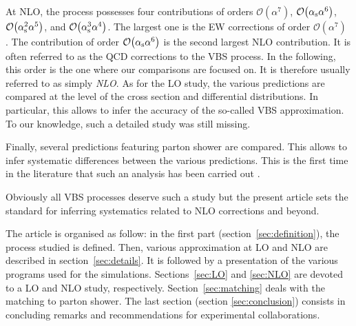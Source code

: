 At NLO, the process possesses four contributions of orders 
$\mathcal{O}{\left(\alpha^{7}\right)}$,
$\mathcal{O}{\left(\alpha_\text{s}\alpha^{6}\right)}$,
$\mathcal{O}{\left(\alpha_\text{s}^{2}\alpha^{5}\right)}$, and
$\mathcal{O}{\left(\alpha_\text{s}^{3}\alpha^{4}\right)}$.
The largest one is the EW corrections of order $\mathcal{O}{\left(\alpha^{7}\right)}$ \cite{Biedermann:2016yds,Biedermann:2017bss}.
The contribution of order $\mathcal{O}{\left(\alpha_\text{s}\alpha^{6}\right)}$ is the second largest NLO contribution.
It is often referred to as the QCD corrections to the VBS process.
In the following, this order is the one where our comparisons are focused on.
It is therefore usually referred to as simply \emph{NLO}.
As for the LO study, the various predictions are compared at the level of the cross section and differential distributions.
In particular, this allows to infer the accuracy of the so-called VBS approximation.
To our knowledge, such a detailed study was still missing.

Finally, several predictions featuring parton shower are compared.
This allows to infer systematic differences between the various predictions.
This is the first time in the literature that such an analysis has been carried out .

Obviously all VBS processes deserve such a study but the present article sets the standard for inferring systematics related to NLO corrections and beyond.


The article is organised as follow:
in the first part (section~\ref{sec:definition}), the process studied is defined.
Then, various approximation at LO and NLO are described in section~\ref{sec:details}.
It is followed by a presentation of the various programs used for the simulations.
Sections~\ref{sec:LO} and \ref{sec:NLO} are devoted to a LO and NLO study, respectively.
Section~\ref{sec:matching} deals with the matching to parton shower.
The last section (section \ref{sec:conclusion}) consists in concluding remarks and recommendations for experimental collaborations.
